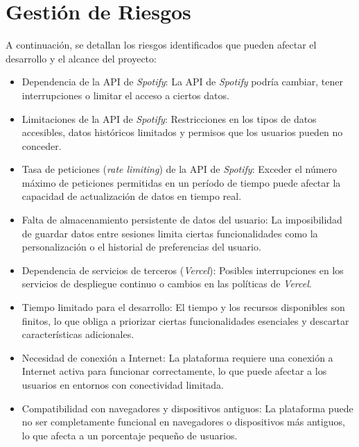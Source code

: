 \section{Gestión de Riesgos}

A continuación, se detallan los riesgos identificados que pueden afectar el desarrollo y el alcance del proyecto:

\begin{itemize}
    \item Dependencia de la API de \textit{Spotify}: La API de \textit{Spotify} podría cambiar, tener interrupciones o limitar el acceso a ciertos datos.

    \item Limitaciones de la API de \textit{Spotify}: Restricciones en los tipos de datos accesibles, datos históricos limitados y permisos que los usuarios pueden no conceder.

    \item Tasa de peticiones (\textit{rate limiting}) de la API de \textit{Spotify}: Exceder el número máximo de peticiones permitidas en un período de tiempo puede afectar la capacidad de actualización de datos en tiempo real.

    \item Falta de almacenamiento persistente de datos del usuario: La imposibilidad de guardar datos entre sesiones limita ciertas funcionalidades como la personalización o el historial de preferencias del usuario.

    \item Dependencia de servicios de terceros (\textit{Vercel}): Posibles interrupciones en los servicios de despliegue continuo o cambios en las políticas de \textit{Vercel}.

    \item Tiempo limitado para el desarrollo: El tiempo y los recursos disponibles son finitos, lo que obliga a priorizar ciertas funcionalidades esenciales y descartar características adicionales.

    \item Necesidad de conexión a Internet: La plataforma requiere una conexión a Internet activa para funcionar correctamente, lo que puede afectar a los usuarios en entornos con conectividad limitada.

    \item Compatibilidad con navegadores y dispositivos antiguos: La plataforma puede no ser completamente funcional en navegadores o dispositivos más antiguos, lo que afecta a un porcentaje pequeño de usuarios.


\end{itemize}
